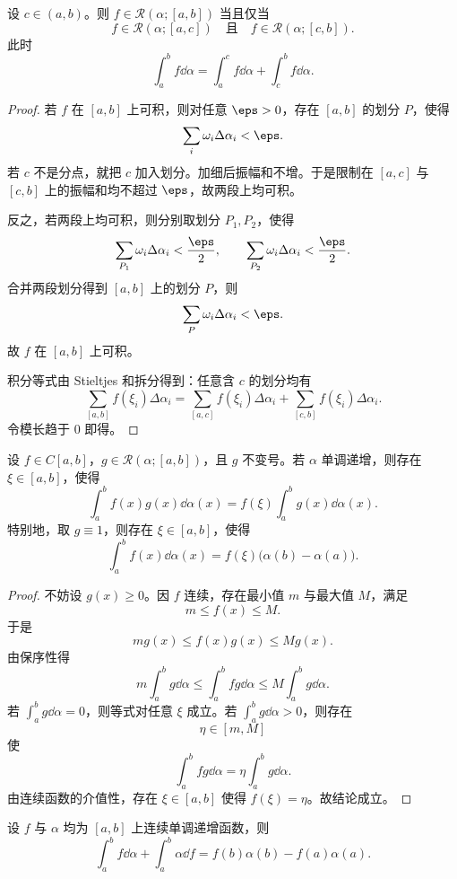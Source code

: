 \begin{proposition}\label{prop:additivity-stieltjes}
	设 $c\in(a,b)$。则 $f\in\mathcal R(\alpha;[a,b])$ 当且仅当
	\[
	f\in\mathcal R(\alpha;[a,c])
	\quad\text{且}\quad
	f\in\mathcal R(\alpha;[c,b]).
	\]
	此时
	\[
	\int_a^b f\dd\alpha
	=\int_a^c f\dd\alpha+
	\int_c^b f\dd\alpha.
	\]
\end{proposition}

\begin{proof}
	若 $f$ 在 $[a,b]$ 上可积，则对任意 $\eps>0$，存在 $[a,b]$ 的划分 $P$，使得
	\[
	\sum_i\omega_i\Delta\alpha_i<\eps.
	\]
	若 $c$ 不是分点，就把 $c$ 加入划分。加细后振幅和不增。于是限制在 $[a,c]$ 与 $[c,b]$ 上的振幅和均不超过 $\eps$，故两段上均可积。
	
	反之，若两段上均可积，则分别取划分 $P_1,P_2$，使得
	\[
	\sum_{P_1}\omega_i\Delta\alpha_i<\frac\eps2,
	\qquad
	\sum_{P_2}\omega_i\Delta\alpha_i<\frac\eps2.
	\]
	合并两段划分得到 $[a,b]$ 上的划分 $P$，则
	\[
	\sum_P\omega_i\Delta\alpha_i<\eps.
	\]
	故 $f$ 在 $[a,b]$ 上可积。
	
	积分等式由 Stieltjes 和拆分得到：任意含 $c$ 的划分均有
	\[
	\sum_{[a,b]} f(\xi_i)\Delta\alpha_i
	=\sum_{[a,c]} f(\xi_i)\Delta\alpha_i
	+\sum_{[c,b]} f(\xi_i)\Delta\alpha_i.
	\]
	令模长趋于 $0$ 即得。
\end{proof}

\begin{proposition}\label{prop:first-mean-stieltjes}
	设 $f\in C[a,b]$，$g\in\mathcal R(\alpha;[a,b])$，且 $g$ 不变号。若 $\alpha$ 单调递增，则存在 $\xi\in[a,b]$，使得
	\[
	\int_a^b f(x)g(x)\dd\alpha(x)
	=f(\xi)\int_a^b g(x)\dd\alpha(x).
	\]
	特别地，取 $g\equiv1$，则存在 $\xi\in[a,b]$，使得
	\[
	\int_a^b f(x)\dd\alpha(x)
	=f(\xi)\bigl(\alpha(b)-\alpha(a)\bigr).
	\]
\end{proposition}

\begin{proof}
	不妨设 $g(x)\geq0$。因 $f$ 连续，存在最小值 $m$ 与最大值 $M$，满足
	\[
	m\leq f(x)\leq M.
	\]
	于是
	\[
	mg(x)\leq f(x)g(x)\leq Mg(x).
	\]
	由保序性得
	\[
	m\int_a^b g\dd\alpha
	\leq \int_a^b fg\dd\alpha
	\leq M\int_a^b g\dd\alpha.
	\]
	若 $\int_a^b g\dd\alpha=0$，则等式对任意 $\xi$ 成立。若 $\int_a^b g\dd\alpha>0$，则存在
	\[
	\eta\in[m,M]
	\]
	使
	\[
	\int_a^b fg\dd\alpha=\eta\int_a^b g\dd\alpha.
	\]
	由连续函数的介值性，存在 $\xi\in[a,b]$ 使得 $f(\xi)=\eta$。故结论成立。
\end{proof}



\begin{proposition}\label{prop:integration-by-parts-stieltjes}
	设 $f$ 与 $\alpha$ 均为 $[a,b]$ 上连续单调递增函数，则
	\[
	\int_a^b f\dd\alpha+\int_a^b \alpha\dd f
	=f(b)\alpha(b)-f(a)\alpha(a).
	\]
\end{proposition}

